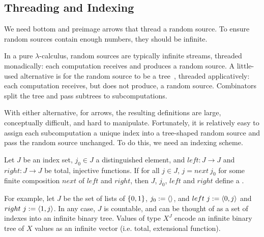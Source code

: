 \documentclass{llncs}
\begin{document}
\subsection{Threading and Indexing}
\label{sec:threading-and-indexing}

We need bottom and preimage arrows that thread a random source.
To ensure random sources contain enough numbers, they should be infinite.

In a pure $\lambda$-calculus, random sources are typically infinite streams, threaded monadically: each computation receives and produces a random source.
A little-used alternative is for the random source to be a tree~\cite{cit:mcallester-2008tr-random-world}, threaded applicatively: each computation receives, but does not produce, a random source.
Combinators split the tree and pass subtrees to subcomputations.

With either alternative, for arrows, the resulting definitions are large, conceptually difficult, and hard to manipulate.
Fortunately, it is relatively easy to assign each subcomputation a unique index into a tree-shaped random source and pass the random source unchanged.
To do this, we need an indexing scheme.

\begin{definition}
Let $J$ be an index set, $j_0 \in J$ a distinguished element, and $left : J \to J$ and $right : J \to J$ be total, injective functions. If for all $j \in J$, $j = next~j_0$ for some finite composition $next$ of $left$ and $right$, then $J$, $j_0$, $left$ and $right$ define a .
\end{definition}

For example, let $J$ be the set of lists of $\{{0,1}\}$, $j_0 := \langle{}\rangle$, and $left~j := \langle{0,j}\rangle$ and $right~j := \langle{1,j}\rangle$.
In any case, $J$ is countable, and can be thought of as a set of indexes into an infinite binary tree.
Values of type $X^J$ encode an infinite binary tree of $X$ values as an infinite vector (i.e. total, extensional function).
\end{document}
